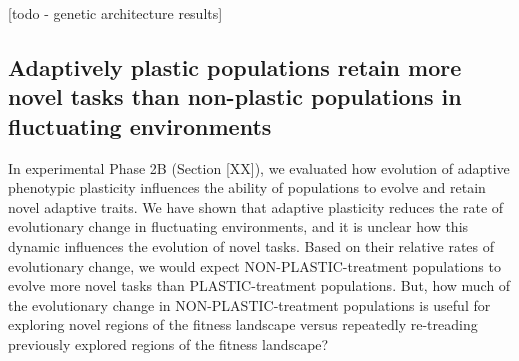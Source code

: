 [todo - genetic architecture results]



\vspace{0.5cm}
\subsection{Adaptively plastic populations retain more novel tasks than non-plastic populations in fluctuating environments}





In experimental Phase 2B (Section [XX]), we evaluated how evolution of adaptive phenotypic plasticity influences the ability of populations to evolve and retain novel adaptive traits.
We have shown that adaptive plasticity reduces the rate of evolutionary change in fluctuating environments, and it is unclear how this dynamic influences the evolution of novel tasks.
Based on their relative rates of evolutionary change, we would expect NON-PLASTIC-treatment populations to evolve more novel tasks than PLASTIC-treatment populations.
But, how much of the evolutionary change in NON-PLASTIC-treatment populations is useful for exploring novel regions of the fitness landscape versus repeatedly re-treading previously explored regions of the fitness landscape?

